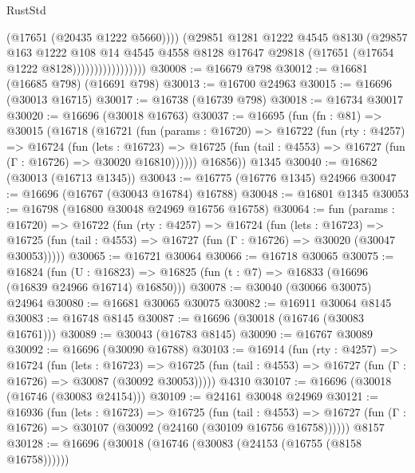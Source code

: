 \begin{lexlean}{RustStd}
\begin{coremodule}
                                  (@17651 (@20435 @1222 @5660))))
                              (@29851
                                @1281
                                @1222
                                @4545
                                @8130
                                (@29857
                                  @163
                                  @1222
                                  @108
                                  @14
                                  @4545
                                  @4558
                                  @8128
                                  @17647
                                  @29818
                                  (@17651 (@17654 @1222 @8128)))))))))))))))))
@30008 := @16679 @798
@30012 := @16681 (@16685 @798) (@16691 @798)
@30013 := @16700 @24963
@30015 := @16696 (@30013 @16715)
@30017 := @16738 (@16739 @798)
@30018 := @16734 @30017
@30020 := @16696 (@30018 @16763)
@30037 := @16695
    (fun (fn : @81) =>
    @30015
      (@16718
        (@16721
          (fun (params : @16720) =>
          @16722
            (fun (rty : @4257) =>
            @16724
              (fun (lets : @16723) =>
              @16725 (fun (tail : @4553) => @16727 (fun (Γ : @16726) => @30020 @16810))))))
        @16856))
    @1345
@30040 := @16862 (@30013 (@16713 @1345))
@30043 := @16775 (@16776 @1345) @24966
@30047 := @16696 (@16767 (@30043 @16784) @16788)
@30048 := @16801 @1345
@30053 := @16798 (@16800 @30048 @24969 @16756 @16758)
@30064 := fun (params : @16720) =>
  @16722
    (fun (rty : @4257) =>
    @16724
      (fun (lets : @16723) =>
      @16725 (fun (tail : @4553) => @16727 (fun (Γ : @16726) => @30020 (@30047 @30053)))))
@30065 := @16721 @30064
@30066 := @16718 @30065
@30075 := @16824
    (fun (U : @16823) => @16825 (fun (t : @7) => @16833 (@16696 (@16839 @24966 @16714) @16850)))
@30078 := @30040 (@30066 @30075) @24964
@30080 := @16681 @30065 @30075
@30082 := @16911 @30064 @8145
@30083 := @16748 @8145
@30087 := @16696 (@30018 (@16746 (@30083 @16761)))
@30089 := @30043 (@16783 @8145)
@30090 := @16767 @30089
@30092 := @16696 (@30090 @16788)
@30103 := @16914
    (fun (rty : @4257) =>
    @16724
      (fun (lets : @16723) =>
      @16725 (fun (tail : @4553) => @16727 (fun (Γ : @16726) => @30087 (@30092 @30053)))))
    @4310
@30107 := @16696 (@30018 (@16746 (@30083 @24154)))
@30109 := @24161 @30048 @24969
@30121 := @16936
    (fun (lets : @16723) =>
    @16725
      (fun (tail : @4553) =>
      @16727 (fun (Γ : @16726) => @30107 (@30092 (@24160 (@30109 @16756 @16758))))))
    @8157
@30128 := @16696 (@30018 (@16746 (@30083 (@24153 (@16755 (@8158 @16758))))))

\end{coremodule}
\end{lexlean}

